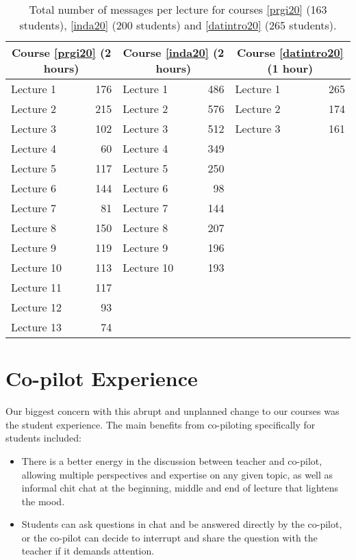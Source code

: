 \documentclass[sigconf,natbib=false]{acmart}
\begin{document}
\begin{table}
    \centering
    \begin{tabular}{lr lr lr}
        \toprule
        \multicolumn{2}{c}{Course \ref{prgi20} (2 hours)} &
        \multicolumn{2}{c}{Course \ref{inda20} (2 hours)} &
        \multicolumn{2}{c}{Course \ref{datintro20} (1 hour)} \\
        \midrule
        Lecture 1 & 176 & Lecture 1 & 486 & Lecture 1 & 265 \\
        Lecture 2 & 215 & Lecture 2 & 576 & Lecture 2 & 174 \\
        Lecture 3 & 102 & Lecture 3 & 512 & Lecture 3 & 161 \\
        Lecture 4 & 60 & Lecture 4 & 349 \\
        Lecture 5 & 117 & Lecture 5 & 250 \\
        Lecture 6 & 144 & Lecture 6 & 98 \\
        Lecture 7 & 81 & Lecture 7 & 144 \\
        Lecture 8 & 150 & Lecture 8 & 207 \\
        Lecture 9 & 119 & Lecture 9 & 196 \\
        Lecture 10 & 113 & Lecture 10 & 193 \\
        Lecture 11 & 117 \\
        Lecture 12 & 93 \\
        Lecture 13 & 74 \\
        \bottomrule
    \end{tabular}
    \caption{Total number of messages per lecture for courses \ref{prgi20} (163 students), \ref{inda20} (200 students) and \ref{datintro20} (265 students).}
    \label{PrgiMessageDist}
\end{table}

\section{Co-pilot Experience}

Our biggest concern with this abrupt and unplanned change to our courses was the student experience. The main benefits from co-piloting specifically for students included:

\begin{itemize}
  \item There is a better energy in the discussion between teacher and co-pilot, allowing multiple perspectives and expertise on any given topic, as well as informal chit chat at the beginning, middle and end of lecture that lightens the mood.

  \item Students can ask questions in chat and be answered directly by the co-pilot, or the co-pilot can decide to interrupt and share the question with the teacher if it demands attention.
\end{itemize}
\end{document}
